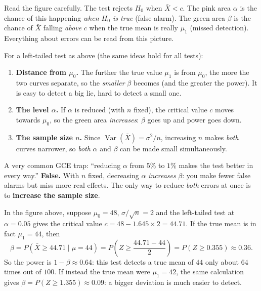 \documentclass[11pt]{article}
\begin{document}
Read the figure carefully. The test rejects $H_0$ when $\bar{X} < c$. The pink area $\alpha$ is the chance of this happening \emph{when $H_0$ is true} (false alarm). The green area $\beta$ is the chance of $\bar{X}$ falling \emph{above} $c$ when the true mean is really $\mu_1$ (missed detection). Everything about errors can be read from this picture.

\begin{propriete}
For a left-tailed test as above (the same ideas hold for all tests):
\begin{enumerate}
\item \textbf{Distance from $\mu_0$.} The further the true value $\mu_1$ is from $\mu_0$, the more the two curves separate, so the \emph{smaller} $\beta$ becomes (and the greater the power). It is easy to detect a big lie, hard to detect a small one.
\item \textbf{The level $\alpha$.} If $\alpha$ is reduced (with $n$ fixed), the critical value $c$ moves towards $\mu_0$, so the green area \emph{increases}: $\beta$ goes up and power goes down.
\item \textbf{The sample size $n$.} Since $\operatorname{Var}(\bar{X})=\sigma^2/n$, increasing $n$ makes \emph{both} curves narrower, so \emph{both} $\alpha$ and $\beta$ can be made small simultaneously.
\end{enumerate}
\end{propriete}

\begin{attention}
A very common GCE trap: ``reducing $\alpha$ from $5\%$ to $1\%$ makes the test better in every way.'' \textbf{False.} With $n$ fixed, decreasing $\alpha$ \emph{increases} $\beta$: you make fewer false alarms but miss more real effects. The only way to reduce \emph{both} errors at once is to \textbf{increase the sample size}.
\end{attention}

\begin{exemplebox}
In the figure above, suppose $\mu_0=48$, $\sigma/\sqrt{n}=2$ and the left-tailed test at $\alpha=0.05$ gives the critical value $c=48-1.645\times 2=44.71$. If the true mean is in fact $\mu_1=44$, then
\[ \beta = P(\bar{X}\ge 44.71 \mid \mu=44) = P\!\left(Z\ge \frac{44.71-44}{2}\right) = P(Z\ge 0.355) \approx 0.36. \]
So the power is $1-\beta\approx 0.64$: this test detects a true mean of $44$ only about $64$ times out of $100$. If instead the true mean were $\mu_1=42$, the same calculation gives $\beta = P(Z\ge 1.355)\approx 0.09$: a bigger deviation is much easier to detect.
\end{exemplebox}
\end{document}
